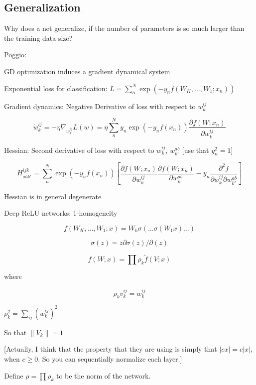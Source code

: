 \documentclass[english]{article}
\begin{document}
\eenum


\subsection{Generalization}


\benum
\item Why does a net generalize, if the number of parameters is so much larger than the training data size?

\item Poggio:

\benum
\item GD optimization induces a gradient dynamical system

\item Exponential loss for classification: $L  = \sum_n^N \exp(-y_n f(W_K,\ldots, W_1; x_n))$

Gradient dynamics: Negative Derivative of loss with respect to $w_k^{ij}$ 

$$
\dot w_k^{ij} 
= 
-\eta \nabla_{w_k^{ij}} L(w)
=
\eta
\sum_n^N y_n\exp(-y_n f(x_n))
\frac{\partial f(W;x_n)}{\partial w_k^{ij}}
$$

Hessian: Second derivative of loss with respect to $w_k^{ij}$, $w_{k'}^{ab}$  [use that $y_n^2=1$]

$$
H_{abk'}^{ijk}
= 
\sum_n^N \exp(-y_n f(x_n))
[
\frac{\partial f(W;x_n)}{\partial w_k^{ij}}
\frac{\partial f(W;x_n)}{\partial w_{k'}^{ab}}
-
y_n\frac{\partial^2f}{\partial w_k^{ij}\partial w_{k'}^{ab}}
]
$$

Hessian is in general degenerate

\item Deep ReLU networks: 1-homogeneity

$$f(W_K,\ldots, W_1; x) = W_k \sigma(\ldots \sigma (W_1x)\ldots)$$

$$\sigma(z) = z \partial \sigma(z)/\partial(z)$$

$$f(W;x) = \prod \rho_k \tilde f(V;x)$$

where 

$$\rho_k v_k^{ij} = w_k^{ij}$$

$\rho_k^2 = \sum_{ij} (w_k^{ij})^2$

So that $\|V_k\|=1$%

[Actually, I think that the property that they are using is simply that $|cx|=c|x|$, when $c\ge 0$. So you can sequentially normalize each layer.]

Define $\rho = \prod \rho_k$ to be the norm of the network.
\end{document}

